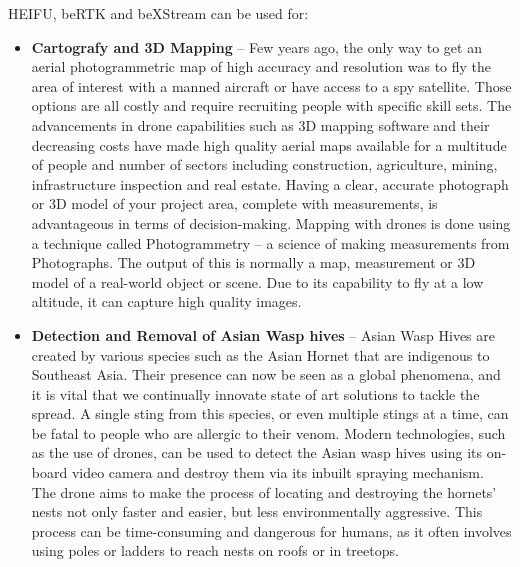 HEIFU, beRTK and beXStream can be used for:
\begin{itemize}
    \item \textbf{Cartografy and 3D Mapping} -- Few years ago, the only way to get an aerial photogrammetric map of high accuracy and resolution was to fly the area of interest with a manned aircraft or have access to a spy satellite. Those options are all costly and require recruiting people with specific skill sets.
    The advancements in drone capabilities such as 3D mapping software and their decreasing costs have made high quality aerial maps available for a multitude of people and number of sectors including construction, agriculture, mining, infrastructure inspection and real estate. Having a clear, accurate photograph or 3D model of your project area, complete with measurements, is advantageous in terms of decision-making.  
    Mapping with drones is done using a technique called Photogrammetry -- a science of making measurements from Photographs. The output of this is normally a map, measurement or 3D model of a real-world object or scene. Due to its capability to fly at a low altitude, it can capture high quality images. 

    \item \textbf{Detection and Removal of Asian Wasp hives} -- Asian Wasp Hives are created by various species such as the Asian Hornet that are indigenous to Southeast Asia.  Their presence can now be seen as a global phenomena, and it is vital that we continually innovate state of art solutions to tackle the spread. A single sting from this species, or even multiple stings at a time, can be fatal to people who are allergic to their venom.
    Modern technologies, such as the use of drones, can be used to detect the Asian wasp hives using its on-board video camera and destroy them via its inbuilt spraying mechanism.
    The drone aims to make the process of locating and destroying the hornets' nests not only faster and easier, but less environmentally aggressive. This process can be time-consuming and dangerous for humans, as it often involves using poles or ladders to reach nests on roofs or in treetops.


\end{itemize}
